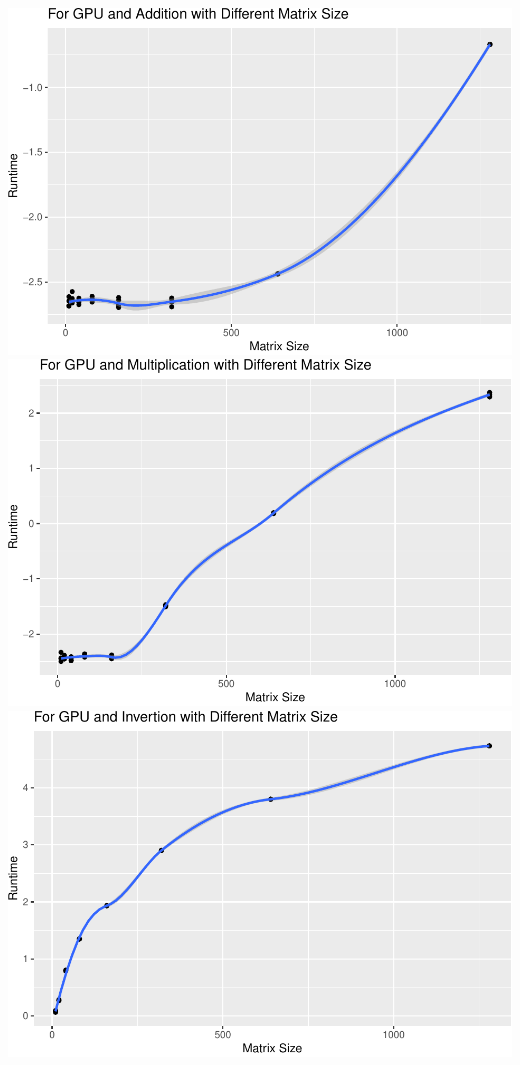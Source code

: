 \documentclass[
]{article}
\begin{document}
\includegraphics{main_files/figure-latex/unnamed-chunk-62-4.pdf}
\includegraphics{main_files/figure-latex/unnamed-chunk-62-5.pdf}
\includegraphics{main_files/figure-latex/unnamed-chunk-62-6.pdf}
\end{document}
